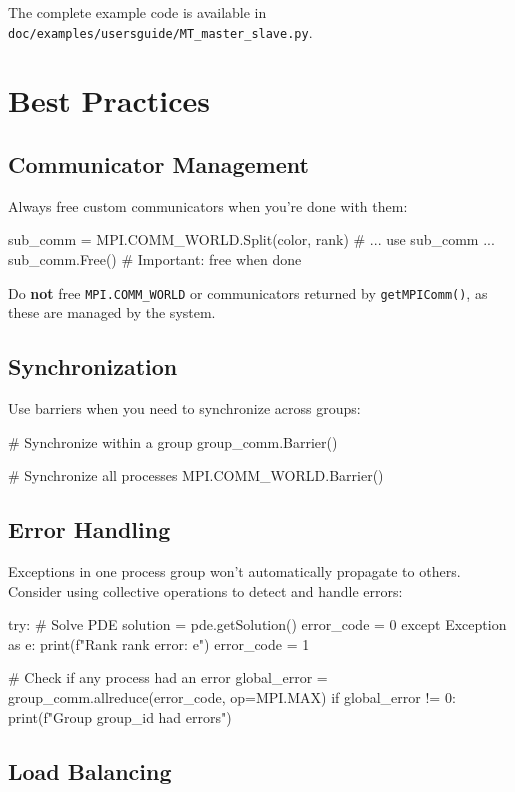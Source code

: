 The complete example code is available in \texttt{doc/examples/usersguide/MT\_master\_slave.py}.

\section{Best Practices}

\subsection{Communicator Management}

Always free custom communicators when you're done with them:
\begin{python}
sub_comm = MPI.COMM_WORLD.Split(color, rank)
# ... use sub_comm ...
sub_comm.Free()  # Important: free when done
\end{python}

Do \textbf{not} free \texttt{MPI.COMM\_WORLD} or communicators returned by \texttt{getMPIComm()}, as these are managed by the system.

\subsection{Synchronization}

Use barriers when you need to synchronize across groups:
\begin{python}
# Synchronize within a group
group_comm.Barrier()

# Synchronize all processes
MPI.COMM_WORLD.Barrier()
\end{python}

\subsection{Error Handling}

Exceptions in one process group won't automatically propagate to others.
Consider using \MPI collective operations to detect and handle errors:

\begin{python}
try:
    # Solve PDE
    solution = pde.getSolution()
    error_code = 0
except Exception as e:
    print(f"Rank {rank} error: {e}")
    error_code = 1

# Check if any process had an error
global_error = group_comm.allreduce(error_code, op=MPI.MAX)
if global_error != 0:
    print(f"Group {group_id} had errors")
\end{python}

\subsection{Load Balancing}

